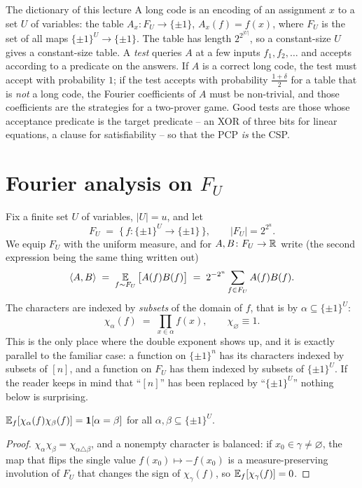 \begin{bigpicture}{The dictionary of this lecture}
A long code is an encoding of an assignment $x$ to a set $U$ of variables: the table $A_x\colon F_U\to\{\pm1\}$, $A_x(f)=f(x)$, where $F_U$ is the set of all maps $\{\pm1\}^U\to\{\pm1\}$.
The table has length $2^{2^{|U|}}$, so a constant-size $U$ gives a constant-size table.
A \emph{test} queries $A$ at a few inputs $f_1,f_2,\dots$ and accepts according to a predicate on the answers.
If $A$ is a correct long code, the test must accept with probability $1$; if the test accepts with probability $\tfrac{1+\delta}{2}$ for a table that is \emph{not} a long code, the Fourier coefficients of $A$ must be non-trivial, and those coefficients are the strategies for a two-prover game.
Good tests are those whose acceptance predicate is the target predicate -- an XOR of three bits for linear equations, a clause for satisfiability -- so that the PCP \emph{is} the CSP.
\end{bigpicture}


\section{Fourier analysis on $F_U$}
\label{sec:fourier-f}

Fix a finite set $U$ of variables, $|U|=u$, and let
\[
  F_U\;=\;\big\{\,f\colon \{\pm1\}^U\to\{\pm1\}\,\big\},\qquad |F_U|=2^{2^{u}} .
\]
We equip $F_U$ with the uniform measure, and for $A,B\colon F_U\to\mathbb{R}$ write (the second expression being the same thing written out)
\[
  \langle A,B\rangle\;=\;\operatorname*{\mathbb{E}}_{f\sim F_U}\big[A(f)B(f)\big]\;=\;2^{-2^{u}}\sum_{f\in F_U}A(f)B(f).
\]
The characters are indexed by \emph{subsets} of the domain of $f$, that is by $\alpha\subseteq\{\pm1\}^U$:
\begin{equation}\label{eq:char-f}
  \chi_\alpha(f)\;=\;\prod_{x\in\alpha}f(x),\qquad \chi_{\varnothing}\equiv1 .
\end{equation}
This is the only place where the double exponent shows up, and it is exactly parallel to the familiar case: a function on $\{\pm1\}^n$ has its characters indexed by subsets of $[n]$, and a function on $F_U$ has them indexed by subsets of $\{\pm1\}^U$.  If the reader keeps in mind that ``$[n]$'' has been replaced by ``$\{\pm1\}^U$'' nothing below is surprising.

\begin{lemma}[Orthonormality]\label{lem:orth-f}
$\operatorname*{\mathbb{E}}_f[\chi_\alpha(f)\chi_\beta(f)]=\mathbf 1[\alpha=\beta]$ for all $\alpha,\beta\subseteq\{\pm1\}^U$.
\end{lemma}
\begin{proof}
$\chi_\alpha\chi_\beta=\chi_{\alpha\triangle\beta}$, and a nonempty character is balanced: if $x_0\in\gamma\ne\varnothing$, the map that flips the single value $f(x_0)\mapsto-f(x_0)$ is a measure-preserving involution of $F_U$ that changes the sign of $\chi_\gamma(f)$, so $\operatorname*{\mathbb{E}}_f[\chi_\gamma(f)]=0$.
\end{proof}

